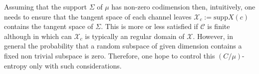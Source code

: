 \documentclass[a4paper,10pt]{article}
\def\X{\mathcal{X}}
\begin{document}
Assuming that the support $\Sigma$ of $\mu$ has non-zero codimension then, intuitively, one needs to ensure that the tangent space of each channel leaves $\X_c:=\mathrm{supp} X(c) $ contains the tangent space of $\Sigma$. This is more or less satisfied if $\mathcal C$ is finite although in which can $\X_c$ is typically an regular domain of $\X$.  However, in general the probability that a random subspace of given dimension contains a fixed non trivial subspace is zero. Therefore, one hope to control this $(C/\mu)$-entropy only with such considerations.
\end{document}
